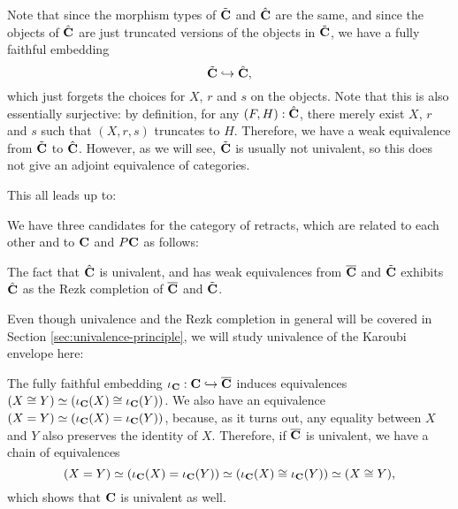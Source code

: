 \begin{remark}
  Note that since the morphism types of $ \tilde {\mathbf{C}} $ and $ \hat {\mathbf{C}} $ are the same, and since the objects of $ \hat {\mathbf{C}} $ are just truncated versions of the objects in $ \tilde {\mathbf{C}} $, we have a fully faithful embedding
  \[ \tilde {\mathbf{C}} \hookrightarrow \hat {\mathbf{C}}, \]
  which just forgets the choices for $ X $, $ r $ and $ s $ on the objects. Note that this is also essentially surjective: by definition, for any $ (F, H) : \hat {\mathbf{C}} $, there merely exist $ X $, $ r $ and $ s $ such that $ (X, r, s) $ truncates to $ H $.
  Therefore, we have a weak equivalence from $ \tilde {\mathbf{C}} $ to $ \hat {\mathbf{C}} $. However, as we will see, $ \tilde {\mathbf{C}} $ is usually not univalent, so this does not give an adjoint equivalence of categories.
\end{remark}

This all leads up to:
\begin{corollary}\label{cor:karoubi-candidates}
  We have three candidates for the category of retracts, which are related to each other and to $ \mathbf{C} $ and $ P\mathbf{C} $ as follows:
  \begin{center}
  \end{center}
  The fact that $ \hat {\mathbf{C}} $ is univalent, and has weak equivalences from $ \overline {\mathbf{C}} $ and $ \tilde {\mathbf{C}} $ exhibits $ \hat {\mathbf{C}} $ as the Rezk completion of $ \overline {\mathbf{C}} $ and $ \tilde {\mathbf{C}} $.
\end{corollary}

Even though univalence and the Rezk completion in general will be covered in Section \ref{sec:univalence-principle}, we will study univalence of the Karoubi envelope here:

\begin{remark}
  The fully faithful embedding $ \iota_{\mathbf{C}} : \mathbf{C} \hookrightarrow \overline {\mathbf{C}} $ induces equivalences $ (X \cong Y) \simeq (\iota_{\mathbf{C}}(X) \cong \iota_{\mathbf{C}}(Y)) $. We also have an equivalence $ (X = Y) \simeq (\iota_{\mathbf{C}}(X) = \iota_{\mathbf{C}}(Y)) $, because, as it turns out, any equality between $ X $ and $ Y $ also preserves the identity of $ X $. Therefore, if $ \overline {\mathbf{C}} $ is univalent, we have a chain of equivalences
  \[ (X = Y) \simeq (\iota_{\mathbf{C}}(X) = \iota_{\mathbf{C}}(Y)) \simeq (\iota_{\mathbf{C}}(X) \cong \iota_{\mathbf{C}}(Y)) \simeq (X \cong Y), \]
  which shows that $ \mathbf{C} $ is univalent as well.
\end{remark}

